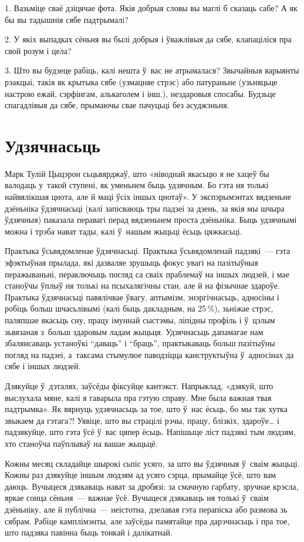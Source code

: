 1. Вазьміце сваё дзіцячае фота. Якія добрыя словы вы маглі б сказаць сабе? А як бы вы тадышнія сябе падтрымалі?

2. У якіх выпадках сёньня вы былі добрыя і ўважлівыя да сябе, клапаціліся пра свой розум і цела?

3. Што вы будзеце рабіць, калі нешта ў~вас не атрымалася? Звычайныя варыянты рэакцыі, такія як крытыка сябе (узмацняе стрэс) або патураньне (узьняцьце настрою ежай, сэрфінгам, алькаголем і інш.), нездаровыя спосабы. Будзьце спагадлівыя да сябе, прымаючы свае пачуцьці без асуджэньня.


\section{Удзячнасьць}

Марк Тулій Цыцэрон сьцьвярджаў, што «ніводнай якасьцю я не хацеў бы валодаць у~такой ступені, як уменьнем быць удзячным. Бо гэта ня толькі найвялікшая цнота, але й маці ўсіх іншых цнотаў». У экспэрымэнтах вядзеньне дзёньніка ўдзячнасьці (калі запісваюць тры падзеі за дзень, за якія мы шчыра ўдзячныя) паказала перавагі перад вядзеньнем проста дзёньніка. Быць удзячнымі можна і трэба нават тады, калі ў~нашым жыцьці ёсьць цяжкасьці.

Практыка ўсьвядомленае ўдзячнасьці. Практыка ўсьвядомленай падзякі~--- гэта эфэктыўная прылада, які дазваляе зрушыць фокус увагі на пазітыўныя перажываньні, пераключыць погляд са сваіх праблемаў на іншых людзей, і мае станоўчы ўплыў ня толькі на псыхалягічны стан, але й на фізычнае здароўе. Практыка ўдзячнасьці павялічвае ўвагу, аптымізм, энэргічнасьць, адносіны і робіць больш шчасьлівымі (калі быць дакладным, на 25\,\%), зьніжае стрэс, паляпшае якасьць сну, працу імуннай сыстэмы, ліпідны профіль і ў~цэлым зьвязаная з~больш здаровым ладам жыцьця. Удзячнасьць дапамагае нам збалянсаваць устаноўкі ``даваць'' і ``браць'', практыкаваць больш пазітыўны погляд на падзеі, а~таксама стымулюе паводзіцца канструктыўна ў~адносінах да сябе і іншых людзей.

Дзякуйце ў~дэталях, заўсёды фіксуйце кантэкст. Напрыклад, «дзякуй, што выслухала мяне, калі я гаварыла пра гэтую справу. Мне была важная твая падтрымка». Як вярнуць удзячнасьць за тое, што ў~нас ёсьць, бо мы так хутка звыкаем да гэтага?! Уявіце, што вы страцілі рэчы, працу, блізкіх, здароўе… і падзякуйце, што гэта ўсё ў~вас цяпер ёсьць. Напішыце ліст падзякі тым людзям, хто станоўча паўплываў на вашае жыцьцё.

Кожны месяц складайце шырокі сьпіс усяго, за што вы ўдзячныя ў~сваім жыцьці. Кожны раз дзякуйце іншым людзям ад усяго сэрца, прымайце ўсё, што вам даюць. Вучыцеся дзякаваць нават за дробязі: за смачную гарбату, зручнае крэсла, яркае сонца сёньня~--- важнае ўсё. Вучыцеся дзякаваць ня толькі ў~сваім дзёньніку, але й публічна~--- неістотна, дзелавая гэта перапіска або размова зь сябрам. Рабіце камплімэнты, але заўсёды памятайце пра дарэчнасьць і пра тое, што падзяка павінна быць тонкай і далікатнай.

